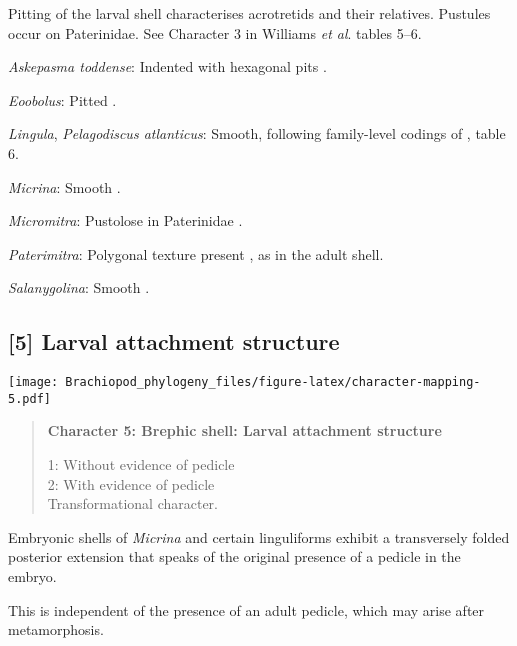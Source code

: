 \documentclass[openany]{book}
\theoremstyle{definition}
\theoremstyle{definition}
\theoremstyle{definition}
\theoremstyle{remark}
\begin{document}
Pitting of the larval shell characterises acrotretids and their
relatives. Pustules occur on Paterinidae. See Character 3 in Williams
\emph{et al}. \citeyearpar{Williams2000LinguliformeaCraniiformea} tables
5--6.

\hypertarget{Askepasma_toddense-coding-4}{}
\emph{Askepasma toddense}: Indented with hexagonal pits \citep[appendix
2]{Williams1998Thediversity}.

\hypertarget{Eoobolus-coding-4}{}
\emph{Eoobolus}: Pitted \citep[table
8]{Williams2000LinguliformeaCraniiformea}.

\hypertarget{Lingula-coding-4}{}
\emph{Lingula}, \emph{Pelagodiscus atlanticus}: Smooth, following
family-level codings of \citet{Williams2000LinguliformeaCraniiformea},
table 6.

\hypertarget{Micrina-coding-4}{}
\emph{Micrina}: Smooth \citep{Holmer2011Firstrecord}.

\hypertarget{Micromitra-coding-4}{}
\emph{Micromitra}: Pustolose in Paterinidae \citep[table
6]{Williams2000LinguliformeaCraniiformea}.

\hypertarget{Paterimitra-coding-4}{}
\emph{Paterimitra}: Polygonal texture present
\citep{Holmer2011Firstrecord}, as in the adult shell.

\hypertarget{Salanygolina-coding-4}{}
\emph{Salanygolina}: Smooth \citep{Holmer2009Theenigmatic}.

\subsection*{{[}5{]} Larval attachment
structure}\label{larval-attachment-structure}

\texttt{[image: Brachiopod\_phylogeny\_files/figure-latex/character-mapping-5.pdf]}

\begin{quote}
\textbf{Character 5: Brephic shell: Larval attachment structure}

1: Without evidence of pedicle\\
2: With evidence of pedicle\\
Transformational character.
\end{quote}

Embryonic shells of \emph{Micrina} and certain linguliforms exhibit a
transversely folded posterior extension that speaks of the original
presence of a pedicle in the embryo.

This is independent of the presence of an adult pedicle, which may arise
after metamorphosis.
\end{document}
